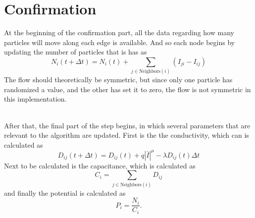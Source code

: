 \documentclass{article}
\begin{document}
\section{Confirmation}
 At the beginning of the confirmation part, all the data regarding how many particles will move along each edge is available. And so each node begins by updating the number of particles that is has as
 \begin{equation}
 N_i(t + \Delta t) = N_i(t) + \sum_{j \in \text{Neighbors}(i)} \left( I_{ji} - I_{ij} \right)
 \end{equation}
 The flow should theoretically be symmetric, but since only one particle has randomized a value, and the other has set it to zero, the flow is not symmetric in this implementation.
 
 \ \\
 
 After that, the final part of the step begins, in which several parameters that are relevant to the algorithm are updated. First is the the conductivity, which can is calculated as
\begin{equation}
D_{ij}(t + \Delta t) = D_{ij}(t) + q|\bar{I}|^\mu - \lambda D_{ij}(t)\Delta t
\end{equation}
Next to be calculated is the capacitance, which is calculated as 
 \begin{equation}
 C_i = \sum_{j \in \text{Neighbors}(i)} D_{ij}
 \end{equation}
 and finally the potential is calculated as
 \begin{equation}
 P_i = \frac{N_i}{C_i}.
 \end{equation}
\end{document}
